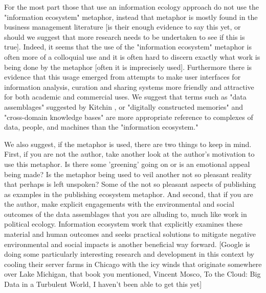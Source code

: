 For the most part those that use an information ecology approach do not use the "information ecosystem" metaphor, instead that metaphor is mostly found in the business management literature [is their enough evidence to say this yet, or should we suggest that more research needs to be undertaken to see if this is true]. Indeed, it seems that the use of the "information ecosystem" metaphor is often more of a colloquial use and it is often hard to discern exactly what work is being done by the metaphor [often it is imprecisely used]. Furthermore there is evidence that this usage emerged from attempts to make user interfaces for information analysis, curation and sharing systems more friendly and attractive for both academic and commercial uses. We suggest that terms such as "data assemblages" suggested by Kitchin \citep{kitchin_2014}, or "digitally constructed memories" and "cross-domain knowledge bases" \citep{baker_2007} are more appropriate reference to complexes of data, people, and machines than the "information ecosystem." 

We also suggest, if the metaphor is used, there are two things to keep in mind. First, if you are not the author, take another look at the author's motivation to use this metaphor. Is there some 'greening' going on or is an emotional appeal being made? Is the metaphor being used to veil another not so pleasant reality that perhaps is left unspoken? Some of the not so pleasant aspects of publishing as examples in the publishing ecosystem metaphor. And second, that if you are the author, make explicit engagements with the environmental and social outcomes of the data assemblages that you are alluding to, much like work in political ecology. Information ecosystem work that explicitly examines these material and human outcomes and seeks practical solutions to mitigate negative environmental and social impacts is another beneficial way forward. [Google is doing some particularly interesting research and development in this context by cooling their server farms in Chicago with the icy winds that originate somewhere over Lake Michigan, that book you mentioned, Vincent Mosco, To the Cloud: Big Data in a Turbulent World, I haven't been able to get this yet]

